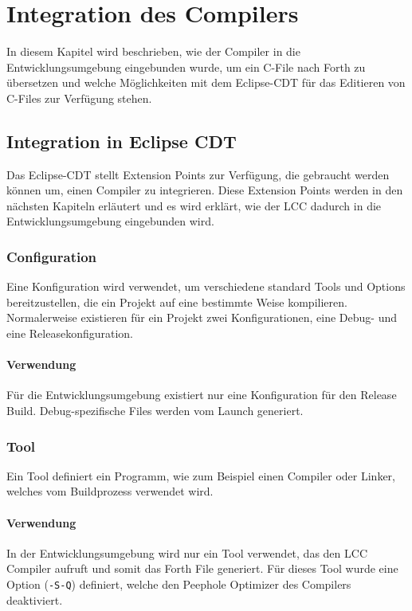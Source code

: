 \chapter{Integration des Compilers}
\label{chap:compilerintegration}

In diesem Kapitel wird beschrieben, wie der Compiler in die Entwicklungsumgebung eingebunden wurde, um ein C-File nach Forth zu übersetzen und welche Möglichkeiten mit dem Eclipse-CDT für das Editieren von C-Files zur Verfügung stehen.

\section{Integration in Eclipse CDT}

Das Eclipse-CDT stellt Extension Points zur Verfügung, die gebraucht werden können um, einen Compiler zu integrieren. Diese Extension Points werden in den nächsten Kapiteln erläutert und es wird erklärt, wie der LCC dadurch in die Entwicklungsumgebung eingebunden wird.

\subsection{Configuration}
Eine Konfiguration wird verwendet, um verschiedene standard Tools und Options bereitzustellen, die ein Projekt auf eine bestimmte Weise kompilieren. Normalerweise existieren für ein Projekt zwei Konfigurationen, eine Debug- und eine Releasekonfiguration.

\subsubsection{Verwendung}
Für die Entwicklungsumgebung existiert nur eine Konfiguration für den Release Build. Debug-spezifische Files werden vom Launch generiert.

\subsection{Tool}
Ein Tool definiert ein Programm, wie zum Beispiel einen Compiler oder Linker, welches vom Buildprozess verwendet wird.

\subsubsection{Verwendung}
In der Entwicklungsumgebung wird nur ein Tool verwendet, das den LCC Compiler aufruft und somit das Forth File generiert. Für dieses Tool wurde eine Option (\verb!-S-Q!) definiert, welche den Peephole Optimizer des Compilers deaktiviert.

